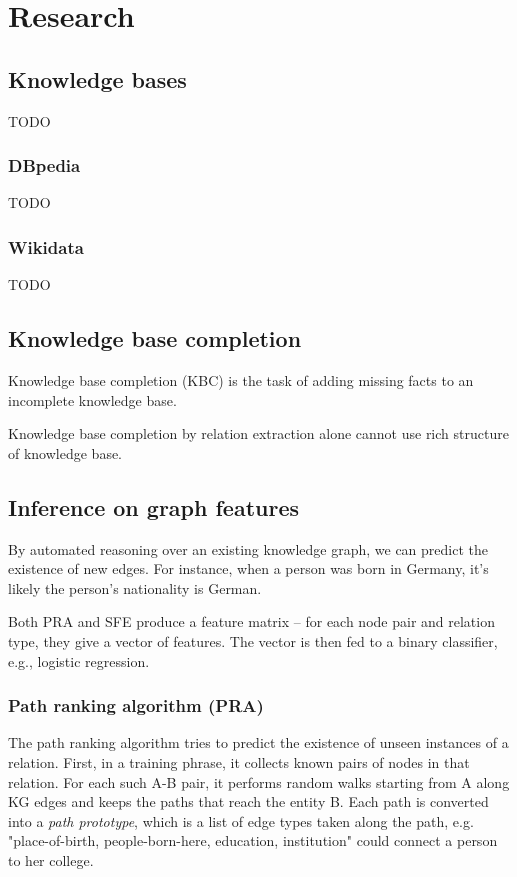 \chapter{Research}

\section{Knowledge bases}

TODO

\subsection{DBpedia}

TODO

\subsection{Wikidata}

TODO

\section{Knowledge base completion}

Knowledge base completion (KBC) is the task of adding missing facts to an
incomplete knowledge base.

Knowledge base completion by relation extraction alone cannot use rich structure
of knowledge base.

\section{Inference on graph features}

By automated reasoning over an existing knowledge graph, we can predict the
existence of new edges. For instance, when a person was born in Germany, it's
likely the person's nationality is German.

Both PRA and SFE produce a feature matrix -- for each node pair and relation
type, they give a vector of features. The vector is then fed to a binary
classifier, e.g., logistic regression.

\subsection{Path ranking algorithm (PRA)}
\label{path-ranking-algorithm}

The path ranking algorithm\cite{path-ranking-algorithm}
tries to predict the existence of unseen instances of a relation.
First, in a training phrase, it collects known pairs of nodes in that relation.
For each such A-B pair, it performs random walks starting from A along KG edges
and keeps the paths that reach the entity B. Each path is converted into a
\textit{path prototype}, which is a list of edge types taken along the path, e.g.
"place-of-birth, people-born-here, education, institution" could connect a
person to her college.

